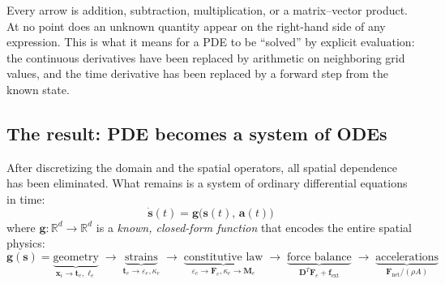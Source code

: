 \documentclass[11pt]{article}
\newcommand{\vect}[1]{\mathbf{#1}}
\newcommand{\mat}[1]{\mathbf{#1}}
\newcommand{\Real}{\mathbb{R}}
\begin{document}
\begin{center}
\end{center}

\noindent
Every arrow is addition, subtraction, multiplication, or a matrix--vector product.
At no point does an unknown quantity appear on the right-hand side of any expression.
This is what it means for a PDE to be ``solved'' by explicit evaluation: the continuous derivatives have been replaced by arithmetic on neighboring grid values, and the time derivative has been replaced by a forward step from the known state.

\subsection{The result: PDE becomes a system of ODEs}

After discretizing the domain and the spatial operators, all spatial dependence has been eliminated.
What remains is a system of ordinary differential equations in time:
\begin{equation}
  \dot{\vect{s}}(t) = \vect{g}\bigl(\vect{s}(t),\, \vect{a}(t)\bigr)
  \label{eq:mol-ode}
\end{equation}
where $\vect{g}: \Real^d \to \Real^d$ is a \emph{known, closed-form function} that encodes the entire spatial physics:
\begin{equation}
  \vect{g}(\vect{s}) = \underbrace{\text{geometry}}_{\vect{x}_i \to \vect{t}_e, \ell_e}
  \;\to\; \underbrace{\text{strains}}_{\vect{t}_e \to \varepsilon_e, \kappa_e}
  \;\to\; \underbrace{\text{constitutive law}}_{\varepsilon_e \to \vect{F}_e, \kappa_e \to \vect{M}_e}
  \;\to\; \underbrace{\text{force balance}}_{\mat{D}^T \vect{F}_e + \vect{f}_{\text{ext}}}
  \;\to\; \underbrace{\text{accelerations}}_{\vect{F}_{\text{net}} / ({\rho A})}
  \label{eq:g-pipeline}
\end{equation}
\end{document}
